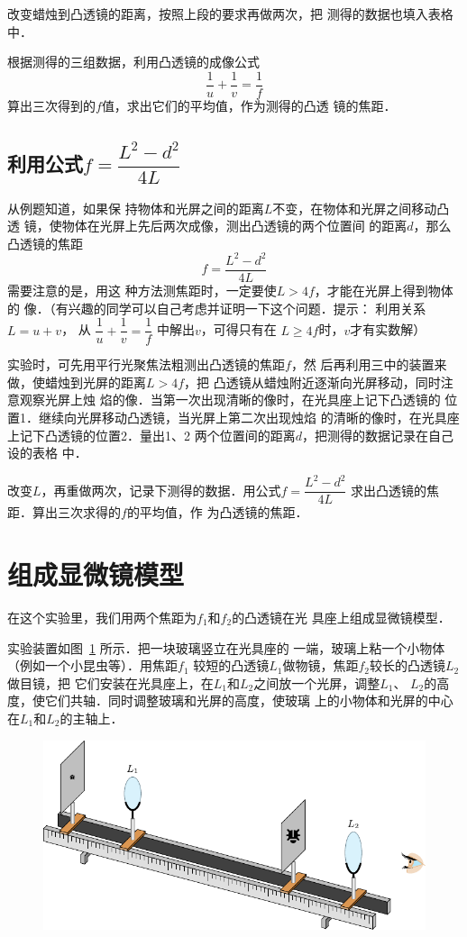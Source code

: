 改变蜡烛到凸透镜的距离，按照上段的要求再做两次，把
测得的数据也填入表格中．

根据测得的三组数据，利用凸透镜的成像公式
\[\frac{1}{u}+\frac{1}{v}=\frac{1}{f} \]
算出三次得到的$f$值，求出它们的平均值，作为测得的凸透
镜的焦距．

\subsection{利用公式$f=\dfrac{L^2-d^2}{4L}$}

从例题知道，如果保
持物体和光屏之间的距离$L$不变，在物体和光屏之间移动凸透
镜，使物体在光屏上先后两次成像，测出凸透镜的两个位置间
的距离$d$，那么凸透镜的焦距
\[f=\dfrac{L^2-d^2}{4L} \]
需要注意的是，用这
种方法测焦距时，一定要使$L>4f$，才能在光屏上得到物体的
像．（有兴趣的同学可以自己考虑并证明一下这个问题．提示：
利用关系$L=u+v$，
从
$\dfrac{1}{u}+\dfrac{1}{v}=\dfrac{1}{f} $
中解出$v$，可得只有在
$L\ge 4f$时，$v$才有实数解）

实验时，可先用平行光聚焦法粗测出凸透镜的焦距$f$，然
后再利用三中的装置来做，使蜡烛到光屏的距离$L>4f$，把
凸透镜从蜡烛附近逐渐向光屏移动，同时注意观察光屏上烛
焰的像．当第一次出现清晰的像时，在光具座上记下凸透镜的
位置1．继续向光屏移动凸透镜，当光屏上第二次出现烛焰
的清晰的像时，在光具座上记下凸透镜的位置2．量出1、2
两个位置间的距离$d$，把测得的数据记录在自己设的表格
中．

改变$L$，再重做两次，记录下测得的数据．用公式$f=\dfrac{L^2-d^2}{4L}$
求出凸透镜的焦距．算出三次求得的$f$的平均值，作
为凸透镜的焦距．

\section{组成显微镜模型}
在这个实验里，我们用两个焦距为$f_1$和$f_2$的凸透镜在光
具座上组成显微镜模型．

实验装置如图~\ref{fig_C_10-8} 所示．把一块玻璃竖立在光具座的
一端，玻璃上粘一个小物体（例如一个小昆虫等）．用焦距$f_1$
较短的凸透镜$L_1$做物镜，焦距$f_2$较长的凸透镜$L_2$做目镜，把
它们安装在光具座上，在$L_1$和$L_2$之间放一个光屏，调整$L_1$、
$L_2$的高度，使它们共轴．同时调整玻璃和光屏的高度，使玻璃
上的小物体和光屏的中心在$L_1$和$L_2$的主轴上．
\begin{figure}[htbp]
    \centering
    \includegraphics{fig/C/10-8.pdf}
    \caption{}\label{fig_C_10-8}
\end{figure}


